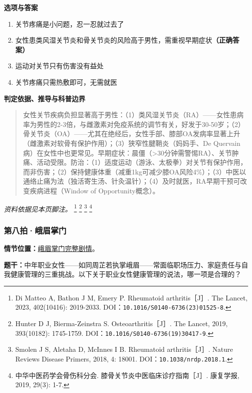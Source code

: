 \textbf{选项与答案}
\begin{enumerate}[label=\Alph*.,leftmargin=*]
  \item 关节疼痛是小问题，忍一忍就过去了
  \item 女性患类风湿关节炎和骨关节炎的风险高于男性，需重视早期症状\textbf{（正确答案）}
  \item 运动对关节只有伤害没有益处
  \item 关节疼痛只需热敷即可，无需就医
\end{enumerate}
\textbf{判定依据、推导与科普边界}
\begin{quote}女性关节疾病负担显著高于男性：（1）类风湿关节炎（RA）——女性患病率为男性的2-3倍，与雌激素对免疫系统的调节有关，好发于30-50岁；（2）骨关节炎（OA）——尤其在绝经后，女性手部、膝部OA发病率显著上升（雌激素对软骨有保护作用）；（3）狭窄性腱鞘炎（妈妈手、De Quervain病）在女性中也更常见。早期症状：晨僵（>30分钟需警惕RA）、关节肿痛、活动受限。防治：（1）适度运动（游泳、太极拳）对关节有保护作用，而非伤害；（2）保持健康体重（减重1kg可减少膝OA风险4\%）；（3）中医以通络止痛为法（独活寄生汤、针灸温针）；（4）及时就医，RA早期干预可改变疾病进程（Window of Opportunity概念）。\end{quote}
\noindent\textit{资料依据见本页脚注。}
\footnote{Di Matteo A, Bathon J M, Emery P. Rheumatoid arthritis［J］. The Lancet, 2023, 402(10416): 2019-2033. DOI：\nolinkurl{10.1016/S0140-6736(23)01525-8}.}
\footnote{Hunter D J, Bierma-Zeinstra S. Osteoarthritis［J］. The Lancet, 2019, 393(10182): 1745-1759. DOI：\nolinkurl{10.1016/S0140-6736(19)30417-9}.}
\footnote{Smolen J S, Aletaha D, McInnes I B. Rheumatoid arthritis［J］. Nature Reviews Disease Primers, 2018, 4: 18001. DOI：\nolinkurl{10.1038/nrdp.2018.1}.}
\footnote{中华中医药学会骨伤科分会. 膝骨关节炎中医临床诊疗指南［J］. 康复学报, 2019, 29(3): 1-7.}

\subsubsection{第八拍·峨眉掌门}\label{question:zhouzhiruo:8}
\textbf{情节位置：}\hyperref[plot:zhouzhiruo:8]{峨眉掌门完整剧情}。

\textbf{题干：}中年职业女性——如同周芷若执掌峨眉——常面临职场压力、家庭责任与自我健康管理的三重挑战。以下关于职业女性健康管理的说法，哪一项是合理的？

